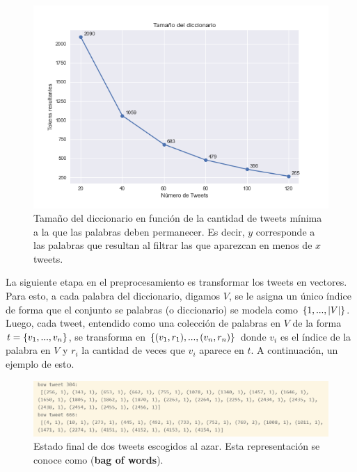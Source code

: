 \documentclass{article}
\begin{document}
	\begin{figure}[H]
		\centering
		\includegraphics[scale=.5]{../imgs/no_below_len_dict.png}
		\caption{Tamaño del diccionario en función de la cantidad de tweets mínima a la que las palabras deben permanecer. Es decir, $y$ corresponde a las palabras que resultan al filtrar las que aparezcan en menos de $x$ tweets.}
	\end{figure}

	

	La siguiente etapa en el preprocesamiento es transformar los tweets en vectores. Para esto, a cada palabra del diccionario, digamos $V$, se le asigna un único índice de forma que el conjunto se palabras (o diccionario) se modela como $\left\{1,...,|V|\right\}$. Luego, cada tweet, entendido como una colección de palabras en $V$ de la forma $t=\left\{v_1,...,v_n\right\}$, se transforma en $\left\{(v_1,r_1),...,(v_n,r_n)\right\}$ donde $v_i$ es el índice de la palabra en $V$ y $r_i$ la cantidad de veces que $v_i$ aparece en $t$. A continuación, un ejemplo de esto.
	
	\begin{figure}[H]
		\centering
		\includegraphics[scale=.5]{../imgs/bow_tweet_informe.png}
		\caption{Estado final de dos tweets escogidos al azar. Esta representación se conoce como  (\textbf{bag of words}).}
		\label{fig: bow_example}
	\end{figure}
	
\end{document}
